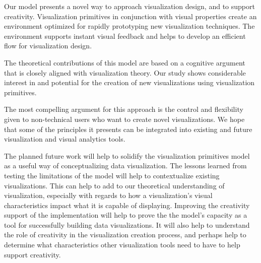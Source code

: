 \label{conclusion}

Our model presents a novel way to approach visualization design, and to support creativity.
Visualization primitives in conjunction with visual properties create an environment optimized for rapidly prototyping new visualization techniques.
The environment supports instant visual feedback and helps to develop an efficient flow for visualization design.

The theoretical contributions of this model are based on a cognitive argument that is closely aligned with visualization theory.
Our study shows considerable interest in and potential for the creation of new visualizations using visualization primitives.

The most compelling argument for this approach is the control and flexibility given to non-technical users who want to create novel visualizations.
We hope that some of the principles it presents can be integrated into existing and future visualization and visual analytics tools.

The planned future work will help to solidify the visualization primitives model as a useful way of conceptualizing data visualization.
The lessons learned from testing the limitations of the model will help to contextualize existing visualizations.
This can help to add to our theoretical understanding of visualization, especially with regards to how a visualization's visual characteristics impact what it is capable of displaying.
Improving the creativity support of the implementation will help to prove the  the model's capacity as a tool for successfully building data visualizations.
It will also help to understand the role of creativity in the visualization creation process, and perhaps help to determine what characteristics other visualization tools need to have to help support creativity.
